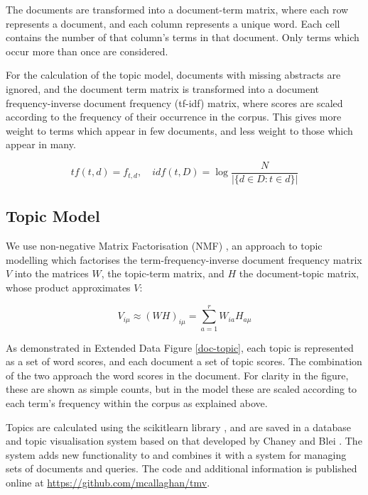 \documentclass{article}
\begin{document}
\begin{linenumbers}
		The documents are transformed into a document-term matrix, where each row represents a document, and each column represents a unique word.  Each cell contains the number of that column's terms in that document. Only terms which occur more than once are considered.
		
		For the calculation of the topic model, documents with missing abstracts are ignored, and the document term matrix is transformed into a document
		frequency-inverse document frequency (tf-idf) matrix, where scores are scaled according to the frequency of their occurrence in the corpus. This gives more weight to terms which appear in few documents, and less weight to those which appear in many.
		
		\begin{equation}
		tf(t,d) = f_{t,d} \mathrm{,}\quad idf(t,D) = \log\frac{N}{|\{d \in D:t \in d\}|}
		\end{equation} 
		
		\subsection*{Topic Model}
		
		We use non-negative Matrix Factorisation (NMF) \cite{Lee1999}, an approach to topic modelling which factorises the term-frequency-inverse document frequency matrix \( V \) into the matrices \(W\), the topic-term matrix, and \( H \) the document-topic matrix, whose product approximates \(V\):
		
		\begin{equation}
		V_{i\mu} \approx (WH)_{i\mu} = \sum_{a=1}^{r}W_{ia}H_{a\mu}
		\end{equation}
		
		As demonstrated in Extended Data Figure \ref{doc-topic}, each topic is represented as a set of word scores, and each document a set of topic scores. The combination of the two approach the word scores in the document. For clarity in the figure, these are shown as simple counts, but in the model these are scaled according to each term's frequency within the corpus as explained above.
		
		Topics are calculated using the scikitlearn library \cite{Pedregosa2011}, and are saved in a database and topic visualisation system based on that developed by Chaney and Blei \cite{Chaney2012}. The system adds new functionality to and combines it with a system for managing sets of documents and queries. The code and additional information is published online at \url{https://github.com/mcallaghan/tmv}. 	
		

\end{linenumbers}
\end{document}
